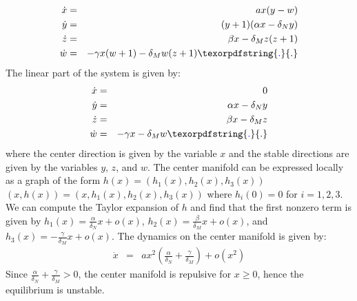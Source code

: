 \documentclass[a4paper, 12pt]{article}
\providecommand{\DIFaddtex}[1]{{\protect\color{blue} \sf #1}} %
\providecommand{\DIFdeltex}[1]{{\protect\color{red} \scriptsize #1}} %
\providecommand{\DIFaddbegin}{} %
\providecommand{\DIFaddend}{} %
\providecommand{\DIFdelbegin}{} %
\providecommand{\DIFdelend}{} %
\providecommand{\DIFadd}[1]{\texorpdfstring{\DIFaddtex{#1}}{#1}} %
\providecommand{\DIFdel}[1]{\texorpdfstring{\DIFdeltex{#1}}{}} %
\begin{document}
\begin{eqnarray*}
\dot{x} &=&  ax (y - w) \\
\dot{y} &=& (y+1)(\alpha x - \delta_N y ) \\
\dot{z} &=& \beta x - \delta_M z (z+1)\\
\dot{w} &=& -\gamma x(w + 1) - \delta_M w (z+ 1)\DIFaddbegin \DIFadd{.
}\DIFaddend \end{eqnarray*} 
The linear part of the system is given by:
\begin{eqnarray*}
\dot{x} &=& 0 \\
\dot{y} &=&\alpha x - \delta_N y \\
\dot{z} &=&\beta x - \delta_M z \\
\dot{w} &=&-\gamma x - \delta_M w\DIFaddbegin \DIFadd{.
}\DIFaddend \end{eqnarray*}
\DIFdelbegin \DIFdel{where the center direction is given by the variable $x$ and the stable directions are given by the variables $y$, $z$, and $w$.
}\DIFdelend The center manifold can be expressed \DIFaddbegin \DIFadd{locally }\DIFaddend as a graph of the form \DIFdelbegin \DIFdel{$h(x) = (h_1(x), h_2(x), h_3(x))$ }\DIFdelend \DIFaddbegin \DIFadd{$(x, h(x)) = (x, h_1(x), h_2(x), h_3(x))$ }\DIFaddend where $h_i(0) = 0$ for $i=1,2,3$.
We can compute the Taylor expansion of $h$ and find that the first nonzero term is given by $h_1(x) = \frac{\alpha}{\delta_N} x + o(x)$, $h_2(x) = \frac{\beta}{\delta_M} x + o(x)$, and $h_3(x) = -\frac{\gamma}{\delta_M} x + o(x)$.
The dynamics on the center manifold is given by: 
\begin{eqnarray*}
\dot{x} &=& ax^2\left(\frac{\alpha}{\delta_N}+ \frac{\gamma}{\delta_M}\right) + o(x^2)
\end{eqnarray*}
Since $\frac{\alpha}{\delta_N}+ \frac{\gamma}{\delta_M} > 0$, the center manifold is repulsive for $x \geq 0$, hence the equilibrium is unstable.
\end{document}
